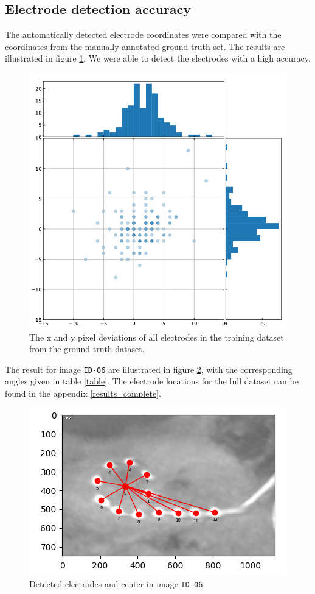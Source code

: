 \documentclass[a4paper, 10pt, twocolumn]{article}
\begin{document}
\subsection{Electrode detection accuracy}
The automatically detected electrode coordinates were compared with the coordinates from the manually annotated ground truth set. The results are illustrated in figure \ref{results_coord}. We were able to detect the electrodes with a high accuracy.
\begin{figure}[ht]
	\centering
  \includegraphics[width=.5\textwidth]{results_coord.jpeg}
	\caption{The x and y pixel deviations of all electrodes in the training dataset from the ground truth dataset.}
	\label{results_coord}
\end{figure}
The result for image \texttt{ID-06} are illustrated in figure \ref{10}, with the corresponding angles given in table \ref{table}. The electrode locations for the full dataset can be found in the appendix \ref{results_complete}.
\begin{figure}[ht]
	\centering
  \includegraphics[width=.5\textwidth]{10.png}
	\caption{Detected electrodes and center in image \texttt{ID-06}}
	\label{10}
\end{figure}
\end{document}

